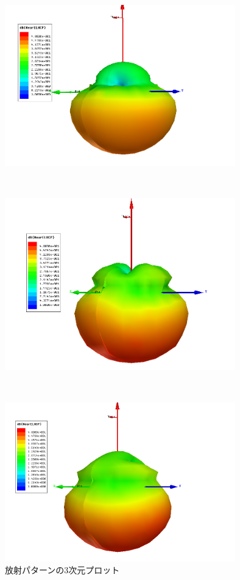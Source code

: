 \documentclass[11pt,a4paper,uplatex]{ujarticle}
\begin{document}
  \clearpage
  \begin{figure}[tbp]
    \begin{minipage}[b]{0.995\textwidth}
      \centering
      \includegraphics[keepaspectratio, width=100mm]{Images/near_E_2GHz.png}
    \end{minipage}\\
    \begin{minipage}[b]{0.995\textwidth}
      \centering
      \includegraphics[keepaspectratio, width=100mm]{Images/near_E_5GHz.png}
    \end{minipage}\\
    \begin{minipage}[b]{0.995\textwidth}
      \centering
      \includegraphics[keepaspectratio, width=100mm]{Images/near_E_10GHz.png}
    \end{minipage}
    \caption{放射パターンの3次元プロット}\label{fig:radiation_pattern_3D}
  \end{figure}
  \clearpage
\end{document}
